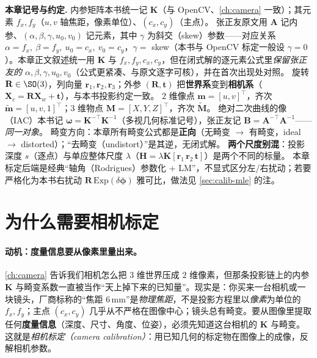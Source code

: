 \begin{note}
\textbf{本章记号与约定.}\;
内参矩阵本书统一记 $\mathbf{K}$（与 OpenCV、\cref{ch:camera} 一致）；其元素 $f_x,f_y$（$u,v$ 轴焦距，像素单位）、$(c_x,c_y)$（主点）。
张正友原文\cite{zhang2000calibration}用 $\mathbf{A}$ 记内参、$(\alpha,\beta,\gamma,u_0,v_0)$ 记元素，其中 $\gamma$ 为斜交（skew）参数——对应关系 $\alpha=f_x,\ \beta=f_y,\ u_0=c_x,\ v_0=c_y$，$\gamma=$ skew（本书与 OpenCV 标定一般设 $\gamma=0$）。本章正文叙述统一用 $\mathbf{K}$ 与 $f_x,f_y,c_x,c_y$，但在闭式解的逐元素公式里\emph{保留张正友的 $\alpha,\beta,\gamma,u_0,v_0$}（公式更紧凑、与原文逐字可核），并在首次出现处对照。
旋转 $\mathbf{R}\in\SO(3)$，列向量 $\mathbf{r}_1,\mathbf{r}_2,\mathbf{r}_3$；外参 $(\mathbf{R},\mathbf{t})$ 把\textbf{世界系}变到\textbf{相机系}（$\mathbf{X}_c=\mathbf{R}\mathbf{X}_w+\mathbf{t}$），与本书投影约定一致。
$2$ 维像点 $\mathbf{m}=[u,v]^\top$，齐次 $\tilde{\mathbf{m}}=[u,v,1]^\top$；$3$ 维物点 $\mathbf{M}=[X,Y,Z]^\top$，齐次 $\tilde{\mathbf{M}}$。
绝对二次曲线的像（IAC）本书记 $\boldsymbol{\omega}=\mathbf{K}^{-\top}\mathbf{K}^{-1}$（多视几何标准记号），张正友记 $\mathbf{B}=\mathbf{A}^{-\top}\mathbf{A}^{-1}$——\emph{同一对象}。
畸变方向：本章所有畸变公式都是\textbf{正向}（无畸变 $\to$ 有畸变，ideal $\to$ distorted）；“去畸变（undistort）”是其逆，无闭式解。
\textbf{两个尺度别混}：投影深度 $s$（逐点）与单应整体尺度 $\lambda$（$\mathbf{H}=\lambda\mathbf{K}[\mathbf{r}_1\,\mathbf{r}_2\,\mathbf{t}]$）是两个不同的标量。
本章标定后端是经典“轴角（Rodrigues）参数化 $+$ LM”，不显式区分左/右扰动；若要严格化为本书右扰动 $\mathbf{R}\,\mathrm{Exp}(\delta\boldsymbol{\phi})$ 雅可比，做法见 \cref{sec:calib-mle} 的注。
\end{note}

\section{为什么需要相机标定}
\label{sec:calib-why}

\paragraph{动机：度量信息要从像素里量出来。}
\cref{ch:camera} 告诉我们相机怎么把 $3$ 维世界压成 $2$ 维像素，但那条投影链上的内参 $\mathbf{K}$ 与畸变系数一直被当作“天上掉下来的已知量”。现实是：你买来一台相机或一块镜头，厂商标称的“焦距 $6\,\mathrm{mm}$”是\emph{物理焦距}，不是投影方程里以\emph{像素}为单位的 $f_x,f_y$；主点 $(c_x,c_y)$ 几乎从不严格在图像中心；镜头总有畸变。要从图像里提取任何\textbf{度量信息}（深度、尺寸、角度、位姿），必须先知道这台相机的 $\mathbf{K}$ 与畸变。这就是\emph{相机标定（camera calibration）}：用已知几何的标定物在图像上的成像，反解相机参数\cite{zhang2000calibration}。

